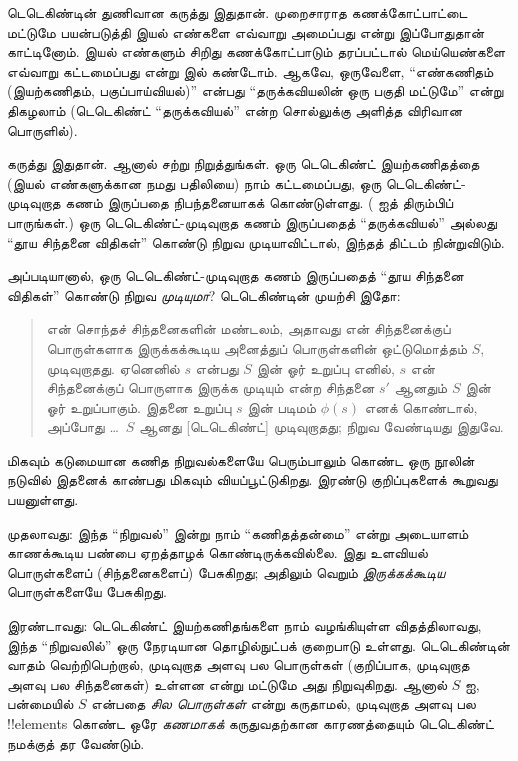 \documentclass[../../../include/open-logic-section]{subfiles}
\begin{document}
டெடெகிண்டின் துணிவான கருத்து இதுதான். முறைசாராத கணக்கோட்பாட்டை
மட்டுமே பயன்படுத்தி இயல் எண்களை எவ்வாறு அமைப்பது என்று இப்போதுதான்
காட்டினோம். இயல் எண்களும் சிறிது கணக்கோட்பாடும் தரப்பட்டால்
மெய்யெண்களை எவ்வாறு கட்டமைப்பது என்று  இல்
கண்டோம். ஆகவே, ஒருவேளை, ``எண்கணிதம் (இயற்கணிதம், பகுப்பாய்வியல்)''
என்பது ``தருக்கவியலின் ஒரு பகுதி மட்டுமே'' என்று திகழலாம்
(டெடெகிண்ட் ``தருக்கவியல்'' என்ற சொல்லுக்கு அளித்த விரிவான பொருளில்).

கருத்து இதுதான். ஆனால் சற்று நிறுத்துங்கள். ஒரு டெடெகிண்ட் இயற்கணிதத்தை
(இயல் எண்களுக்கான நமது பதிலியை) நாம் கட்டமைப்பது, ஒரு
டெடெகிண்ட்-முடிவுறாத கணம் இருப்பதை நிபந்தனையாகக் கொண்டுள்ளது.
( ஐத்
திரும்பிப் பாருங்கள்.) ஒரு டெடெகிண்ட்-முடிவுறாத கணம் இருப்பதைத்
``தருக்கவியல்'' அல்லது ``தூய சிந்தனை விதிகள்'' கொண்டு நிறுவ
முடியாவிட்டால், இந்தத் திட்டம் நின்றுவிடும்.

அப்படியானால், ஒரு டெடெகிண்ட்-முடிவுறாத கணம் இருப்பதைத்
``தூய சிந்தனை விதிகள்'' கொண்டு நிறுவ \emph{முடியுமா}?
டெடெகிண்டின் முயற்சி இதோ:

\begin{quote}
  என் சொந்தச் சிந்தனைகளின் மண்டலம், அதாவது என் சிந்தனைக்குப்
  பொருள்களாக இருக்கக்கூடிய அனைத்துப் பொருள்களின் ஒட்டுமொத்தம் $S$,
  முடிவுறாதது. ஏனெனில் $s$ என்பது $S$ இன் ஓர் உறுப்பு எனில்,
  $s$ என் சிந்தனைக்குப் பொருளாக இருக்க முடியும் என்ற சிந்தனை $s'$
  ஆனதும் $S$ இன் ஓர் உறுப்பாகும். இதனை உறுப்பு $s$ இன் படிமம்
  $\phi(s)$ எனக் கொண்டால், அப்போது \dots~$S$ ஆனது [டெடெகிண்ட்]
  முடிவுறாதது; நிறுவ வேண்டியது இதுவே.
	\citep[\S66]{Dedekind1888}
\end{quote}

மிகவும் கடுமையான கணித நிறுவல்களையே பெரும்பாலும் கொண்ட ஒரு நூலின்
நடுவில் இதனைக் காண்பது மிகவும் வியப்பூட்டுகிறது. இரண்டு குறிப்புகளைக்
கூறுவது பயனுள்ளது.

முதலாவது: இந்த ``நிறுவல்'' இன்று நாம் ``கணிதத்தன்மை'' என்று
அடையாளம் காணக்கூடிய பண்பை ஏறத்தாழக் கொண்டிருக்கவில்லை.
இது உளவியல் பொருள்களைப் (சிந்தனைகளைப்) பேசுகிறது; அதிலும் வெறும்
\emph{இருக்கக்கூடிய} பொருள்களையே பேசுகிறது.

இரண்டாவது: டெடெகிண்ட் இயற்கணிதங்களை நாம் வழங்கியுள்ள விதத்திலாவது,
இந்த ``நிறுவலில்'' ஒரு நேரடியான தொழில்நுட்பக் குறைபாடு உள்ளது.
டெடெகிண்டின் வாதம் வெற்றிபெற்றால், முடிவுறாத அளவு பல பொருள்கள்
(குறிப்பாக, முடிவுறாத அளவு பல சிந்தனைகள்) உள்ளன என்று மட்டுமே
அது நிறுவுகிறது. ஆனால் $S$ ஐ, பன்மையில் $S$ என்பதை
\emph{சில பொருள்கள்} என்று
கருதாமல், முடிவுறாத அளவு பல !!{element}s கொண்ட ஒரே \emph{கணமாகக்}
கருதுவதற்கான காரணத்தையும் டெடெகிண்ட் நமக்குத் தர வேண்டும்.
\end{document}
